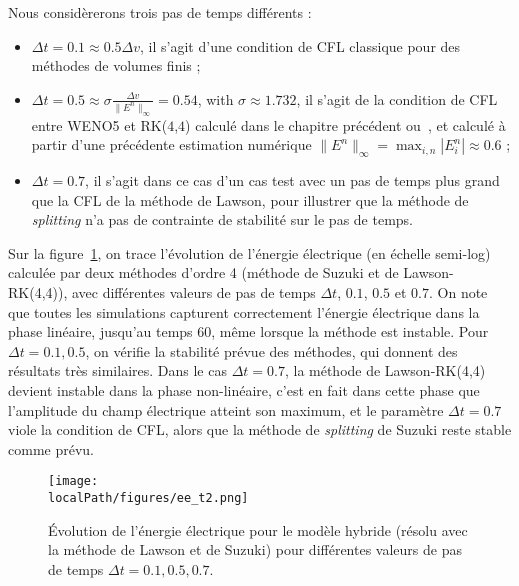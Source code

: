 Nous considèrerons trois pas de temps différents :
\begin{itemize}
  \item $\Delta t = 0.1 \approx 0.5\Delta v$, il s'agit d'une condition de CFL classique pour des méthodes de volumes finis ;
  \item $\Delta t = 0.5 \approx \sigma\frac{\Delta v}{\|E^n\|_\infty} = 0.54$, with $\sigma\approx 1.732$, il s'agit de la condition de CFL entre WENO5 et RK($4$,$4$) calculé dans le chapitre précédent ou~\cite{Crouseilles:2019b}, et calculé à partir d'une précédente estimation numérique $\|E^n\|_\infty = \max_{i,n}|E^n_i|\approx 0.6$ ;
  \item $\Delta t = 0.7$, il s'agit dans ce cas d'un cas test avec un pas de temps plus grand que la CFL de la méthode de Lawson, pour illustrer que la méthode de \emph{splitting} n'a pas de contrainte de stabilité sur le pas de temps.
\end{itemize}

Sur la figure~\ref{fig:compare:ee}, on trace l'évolution de l'énergie électrique (en échelle semi-log) calculée par deux méthodes d'ordre 4 (méthode de Suzuki et de Lawson-RK(4,4)), avec différentes valeurs de pas de temps $\Delta t$, $0.1$, $0.5$ et $0.7$. On note que toutes les simulations capturent correctement l'énergie électrique dans la phase linéaire, jusqu'au temps 60, même lorsque la méthode est instable. Pour $\Delta t=0.1,0.5$, on vérifie la stabilité prévue des méthodes, qui donnent des résultats très similaires. Dans le cas $\Delta t=0.7$, la méthode de Lawson-RK(4,4) devient instable dans la phase non-linéaire, c'est en fait dans cette phase que l'amplitude du champ électrique atteint son maximum, et le paramètre $\Delta t=0.7$ viole la condition de CFL, alors que la méthode de \emph{splitting} de Suzuki reste stable comme prévu.

\begin{figure}[h]
  \centering
  \texttt{[image: \\localPath/figures/ee\_t2.png]}
  \caption{Évolution de l'énergie électrique pour le modèle hybride (résolu avec la méthode de Lawson et de Suzuki) pour différentes valeurs de pas de temps $\Delta t=0.1,0.5,0.7$.}
  \label{fig:compare:ee}
\end{figure}


